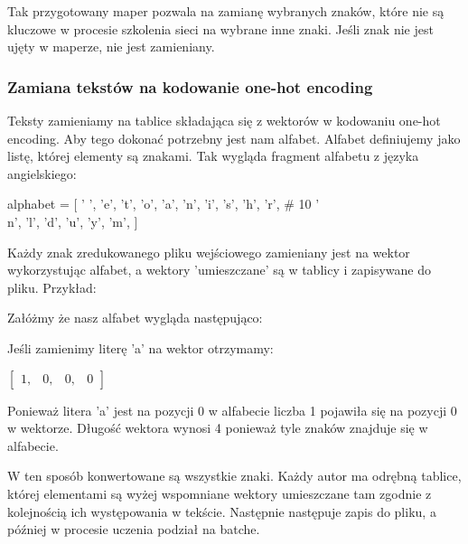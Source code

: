 Tak przygotowany maper pozwala na zamianę wybranych znaków, które nie są kluczowe w procesie 
szkolenia sieci na wybrane inne znaki. Jeśli znak nie jest ujęty w maperze, nie jest zamieniany. 

\subsubsection{Zamiana tekstów na kodowanie one-hot encoding}
Teksty zamieniamy na tablice składająca się z wektorów w kodowaniu one-hot encoding. 
Aby tego dokonać potrzebny jest nam alfabet. Alfabet definiujemy jako listę, której 
elementy są znakami. Tak wygląda fragment alfabetu z języka angielskiego:
\begin{python}
alphabet = [
    ' ',
    'e',
    't',
    'o',
    'a',
    'n',
    'i',
    's',
    'h',
    'r',  # 10
    '\\n',
    'l',
    'd',
    'u',
    'y',
    'm',
]
\end{python}

Każdy znak zredukowanego pliku wejściowego zamieniany jest na wektor wykorzystując alfabet, 
a wektory 'umieszczane' są w tablicy i zapisywane do pliku. Przykład:

Załóżmy że nasz alfabet wygląda następująco:

Jeśli zamienimy literę 'a' na wektor otrzymamy: 
 
\vspace{2mm}
$
\begin{bmatrix} 
1, & 0, & 0, & 0
\end{bmatrix} 
$
\vspace{2mm}

Ponieważ litera 'a' jest na pozycji 0 w alfabecie liczba 1 pojawiła się na pozycji 0 w wektorze.
Długość wektora wynosi 4 ponieważ tyle znaków znajduje się w alfabecie.

W ten sposób konwertowane są wszystkie znaki.
Każdy autor ma odrębną tablice, której elementami są wyżej wspomniane wektory umieszczane tam zgodnie 
z kolejnością ich występowania w tekście. 
Następnie następuje zapis do pliku, a później w procesie uczenia podział na batche.
